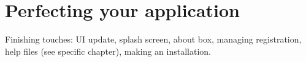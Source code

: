 \chapter{Perfecting your application}\label{chapperfecting}
%
%
\setfooter{\thepage}{}{}{}{}{\thepage}%

Finishing touches: UI update, splash screen, about box, managing registration, help files (see specific chapter),
making an installation.

